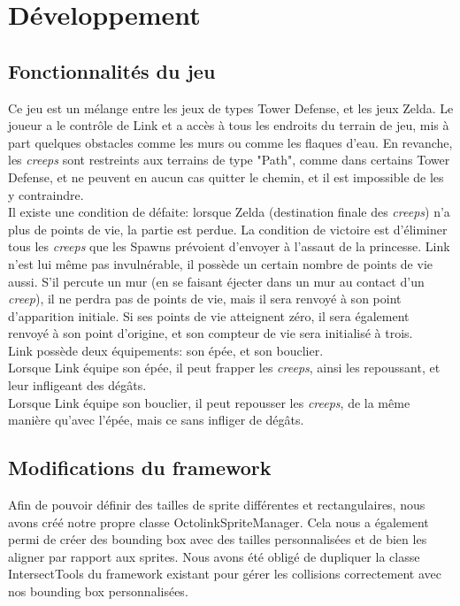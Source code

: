 \chapter{Développement}

\section{Fonctionnalités du jeu}

Ce jeu est un mélange entre les jeux de types Tower Defense, et les jeux Zelda.
Le joueur a le contrôle de Link et a accès à tous les endroits du terrain de
jeu, mis à part quelques obstacles comme les murs ou comme les flaques d'eau.
En revanche, les \emph{creeps} sont restreints aux terrains de type
"Path", comme dans certains Tower Defense, et ne peuvent en aucun cas quitter le chemin, et il est
impossible de les y contraindre.\\
Il existe une condition de défaite: lorsque Zelda (destination finale des
\emph{creeps}) n'a plus de points de vie, la partie est perdue.
La condition de victoire est d'éliminer tous les \emph{creeps} que les Spawns
prévoient d'envoyer à l'assaut de la princesse.
Link n'est lui même pas invulnérable, il possède un certain nombre de points
de vie aussi. S'il percute un mur (en se faisant éjecter dans un mur au
contact d'un \emph{creep}), il ne perdra pas de points de vie, mais il sera
renvoyé à son point d'apparition initiale.
Si ses points de vie atteignent zéro, il sera également renvoyé à son point
d'origine, et son compteur de vie sera initialisé à trois.\\
Link possède deux équipements: son épée, et son bouclier.\\
Lorsque Link équipe son épée, il peut frapper les \emph{creeps}, ainsi les
repoussant, et leur infligeant des dégâts.\\
Lorsque Link équipe son bouclier, il peut repousser les \emph{creeps}, de la
même manière qu'avec l'épée, mais ce sans infliger de dégâts.\\


\section{Modifications du framework}

Afin de pouvoir définir des tailles de sprite différentes et rectangulaires,
nous avons créé notre propre classe OctolinkSpriteManager. Cela nous a également
permi de créer des bounding box avec des tailles personnalisées et de bien les
aligner par rapport aux sprites. Nous avons été obligé de dupliquer la classe
IntersectTools du framework existant pour gérer les collisions correctement avec
nos bounding box personnalisées.

